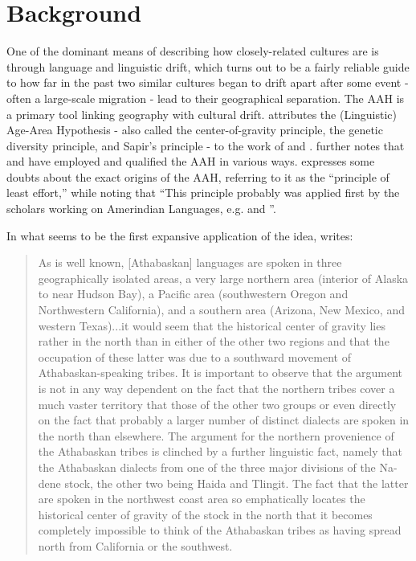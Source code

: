 \documentclass[11pt]{article}
\begin{document}
\section{Background}

One of the dominant means of describing how closely-related cultures are is through language and linguistic drift, which turns out to be a fairly reliable guide to how far in the past two similar cultures began to drift apart after some event - often a large-scale migration - lead to their geographical separation. The AAH is a primary tool linking geography with cultural drift. \citet[p.12]{trask00} attributes the (Linguistic) Age-Area Hypothesis - also called the center-of-gravity principle, the genetic diversity principle, and Sapir's principle - to the work of \cite{latham51}  and \cite{sapir16}. \cite{trask00} further notes that \cite{mallory97} and \cite{nichols97} have employed and qualified the AAH in various ways.   \citet[p.336]{dimmendaal11} expresses some doubts about the exact origins of the AAH, referring to it as the ``principle of least effort,'' while noting that ``This principle probably was applied first by the scholars working on Amerindian Languages, e.g. \cite{sapir16} and \cite{dyen56}''.

In what seems to be the first expansive  application of the idea, \cite{sapir16} writes:

\begin{quote}
 As is well known, [Athabaskan] languages are spoken in three geographically isolated areas, a very large northern area (interior of Alaska to near Hudson Bay), a Pacific area (southwestern Oregon and Northwestern California), and a southern area (Arizona, New Mexico, and western Texas)...it would seem that the historical center of gravity lies rather in the north than in either of the other two regions and that the occupation of these latter was due to a southward movement of Athabaskan-speaking tribes. It is important to observe that the argument is not in any way dependent on the fact that the northern tribes cover a much vaster territory that those of the other two groups or even directly on the fact that probably a larger number of distinct dialects are spoken in the north than elsewhere. The argument for the northern provenience of the Athabaskan tribes is clinched by a further linguistic fact, namely that the Athabaskan dialects from one of the three major divisions of the Na-dene stock, the other two being Haida and Tlingit. The fact that the latter are spoken in the northwest coast area so emphatically locates the historical center of gravity of the stock in the north that it becomes completely impossible to think of the Athabaskan tribes as having spread north from California or the southwest. 
\end{quote}
\end{document}
